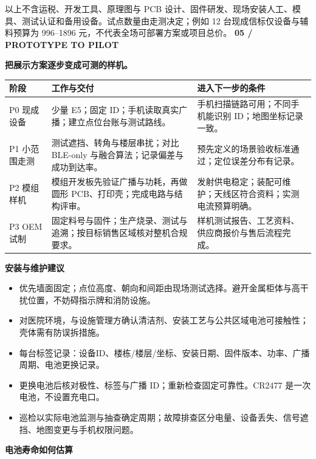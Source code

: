 \documentclass[UTF8,fontset=fandol,11pt]{ctexart}
\newcommand{\kicker}[1]{{\color{green}\small\bfseries #1}\par}
\newcommand{\titleline}[1]{{\LARGE\bfseries #1}\par\vspace{4mm}}
\begin{document}
以上不含运税、开发工具、原理图与 PCB 设计、固件研发、现场安装人工、模具、测试认证和备用设备。试点数量由走测决定；例如 12 台现成信标仅设备与辅料预算为 996--1896 元，不代表全场可部署方案或项目总价。
\newpage
\kicker{05 / PROTOTYPE TO PILOT}\titleline{把展示方案逐步变成可测的样机。}
\par
\begin{tabularx}{\linewidth}{@{}p{25mm}X X@{}}\toprule
阶段 & 工作与交付 & 进入下一步的条件\\\midrule
P0 现成设备 & 少量 E5；固定 ID；手机读取真实广播；建立点位台账与测试路线。 & 手机扫描链路可用；不同手机能识别 ID；地图坐标记录一致。\\
P1 小范围走测 & 测试遮挡、转角与楼层串扰；对比 BLE-only 与融合算法；记录偏差与成功到达率。 & 预先定义的场景验收标准通过；定位误差分布有记录。\\
P2 模组样机 & 模组开发板先验证广播与功耗，再做圆形 PCB、打印壳；完成电路与结构评审。 & 发射供电稳定；装配可维护；天线区符合资料；实测电流预算明确。\\
P3 OEM 试制 & 固定料号与固件；生产烧录、测试与追溯；按目标销售区域核对整机合规要求。 & 样机测试报告、工艺资料、供应商报价与售后流程完成。\\\bottomrule\end{tabularx}\par
\vspace{4mm}
\textbf{安装与维护建议}
\begin{itemize}
\item 优先墙面固定；点位高度、朝向和间距由现场测试选择。避开金属柜体与高干扰位置，不妨碍指示牌和消防设施。
\item 对医院环境，与设施管理方确认清洁剂、安装工艺与公共区域电池可接触性；壳体需有防误拆措施。
\item 每台标签记录：设备ID、楼栋/楼层/坐标、安装日期、固件版本、功率、广播周期、电池更换记录。
\item 更换电池后核对极性、标签与广播 ID；重新检查固定可靠性。CR2477 是一次电池，不设置充电口。
\item 巡检以实际电池监测与抽查确定周期；故障排查区分电量、设备丢失、信号遮挡、地图变更与手机权限问题。
\end{itemize}
\textbf{电池寿命如何估算}
\end{document}
